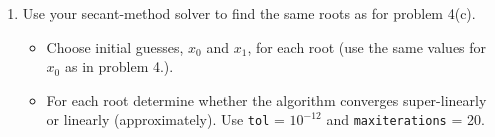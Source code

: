 \documentclass[10pt,letterpaper]{article}
\begin{document}
\begin{enumerate}
\item Use your secant-method solver to find the same roots as for problem 4(c).

\begin{itemize}

\item Choose initial guesses, $x_{0}$ and $x_{1}$, for each root (use the same values for $x_{0}$ as in problem 4.).

\item For each root determine whether the algorithm converges super-linearly or linearly (approximately). Use {\tt tol} = $10^{-12}$ and {\tt maxiterations} = 20. 

\end{itemize}

\end{enumerate}
\end{document}
